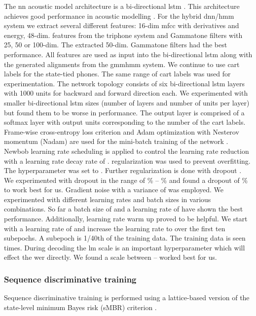 \documentclass[a4paper]{article}
\begin{document}
The \ac{nn} acoustic model architecture is a bi-directional \ac{lstm} \cite{hochreiter1997:lstm,graves2013hybrid}.
This architecture achieves good performance in acoustic modelling \cite{graves2013hybrid,zeyer17:lstm}.
For the hybrid \ac{dnn}/\ac{hmm} system we extract several different features: 16-dim \ac{mfcc} with derivatives and energy, 48-dim. features from the triphone system and Gammatone filters \cite{schlueter:icassp07} with 25, 50 or 100-dim.
The extracted 50-dim. Gammatone filters had the best performance.
All features are used as input into the bi-directional \ac{lstm} along with the generated alignments from the \ac{gmmhmm} system.
We continue to use \ac{cart} labels for the state-tied phones.
The same range of \ac{cart} labels was used for experimentation.
The network topology consists of six bi-directional \ac{lstm} layers with 1000 units for backward and forward direction each.
We experimented with smaller bi-directional \ac{lstm} sizes (number of layers and number of units per layer) but found them to be worse in performance.
The output layer is comprised of a softmax layer with output units corresponding to the number of the \ac{cart} labels.
Frame-wise cross-entropy loss criterion and Adam optimization with Nesterov momentum (Nadam) are used for the mini-batch training of the network \cite{kingma2014:adam,dozat2016:incorporating}.
Newbob learning rate scheduling \cite{zeyer17:lstm} is applied to control the learning rate reduction with a learning rate decay rate of .
 regularization was used to prevent overfitting.
The  hyperparameter was set to .
Further regularization is done with dropout \cite{srivastava2014:dropout}.
We experimented with dropout in the range of \% -- \% and found a dropout of \% to work best for us.
Gradient noise \cite{neelakantan2015:adding} with a variance of  was employed.
We experimented with different learning rates and batch sizes in various combinations.
So far a batch size of  and a learning rate of  have shown the best performance.
Additionally, learning rate warm up proved to be helpful.
We start with a learning rate of  and increase the learning rate to  over the first ten subepochs.
A subepoch is 1/40th of the training data.
The training data is seen  times.
During decoding the \ac{lm} scale is an important hyperparameter which will effect the \ac{wer} directly.
We found a scale between -- worked best for us.


\subsubsection{Sequence discriminative training}
\label{sec:seqdisc}
Sequence discriminative training is performed using a lattice-based version of the state-level minimum Bayes risk (sMBR) criterion \cite{mbr}.
\end{document}
